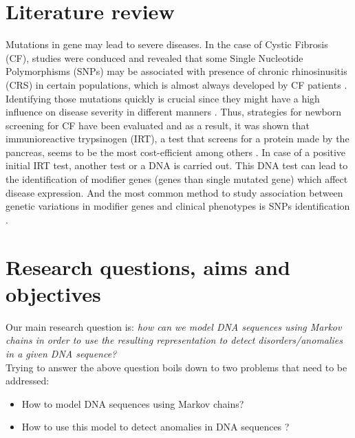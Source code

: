 \documentclass[10pt,twocolumn,letterpaper]{article}
\begin{document}
\section{Literature review}
{

Mutations in gene may lead to severe diseases. In the case of Cystic Fibrosis (CF), studies were conduced and revealed that some Single Nucleotide Polymorphisms (SNPs) may be associated with presence of chronic rhinosinusitis (CRS) in certain populations, which is almost always developed by CF patients  \cite[Bejamen Hull et al., 2017]{SNP_cystic_fibrosis}. Identifying those mutations quickly is crucial since they might have a high influence on disease severity in different manners \cite[Franziska Gisler, 2013]{SNP_identification}. 
Thus, strategies for newborn screening for CF have been evaluated and as a result, it was shown that immunioreactive trypsinogen (IRT), a test that screens for a protein made by the pancreas, seems to be the most cost-efficient among others \cite[Masja Schmidt et al., 2018]{Newborn_screening_for_CF}. In case of a positive initial IRT test, another test or a DNA is carried out. This DNA test can lead to the identification of modifier genes (genes than single mutated gene) which affect disease expression.
And the most common method to study association between genetic variations in modifier genes and clinical phenotypes is SNPs identification \cite[Martijn Slieker et al., 2005]{disease_modifying_genes}. 


}

\section{Research questions, aims and objectives}
 {
    Our main research question is: \textit{how can we model DNA sequences using Markov chains in order 
    to use the resulting representation to detect disorders/anomalies in a given DNA sequence?}\\
    Trying to answer the above question boils down to two problems that need to be addressed:
    \begin{itemize}
        \item How to model DNA sequences using Markov chains?
        \item How to use this model to detect anomalies in DNA sequences \cite{scientific_american}?
    \end{itemize}

 }
\end{document}
